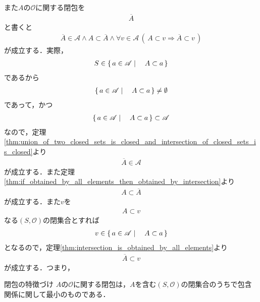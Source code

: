 	また$A$の$\mathscr{O}$に関する閉包を
	\begin{align}
		\overline{A}
	\end{align}
	と書くと
	\begin{align}
		\overline{A} \in \mathscr{A} \wedge A \subset \overline{A} \wedge
		\forall v \in \mathscr{A}\, \left(\, A \subset v \Longrightarrow \overline{A} \subset v\, \right)
		\label{fom:closure_is_the_smallest_closed_set}
	\end{align}
	が成立する．実際，
	\begin{align}
		S \in \left\{\, a \in \mathscr{A} \mid \quad A \subset a\, \right\}
	\end{align}
	であるから
	\begin{align}
		\left\{\, a \in \mathscr{A} \mid \quad A \subset a\, \right\} \neq \emptyset
	\end{align}
	であって，かつ
	\begin{align}
		\left\{\, a \in \mathscr{A} \mid \quad A \subset a\, \right\} \subset \mathscr{A}
	\end{align}
	なので，定理\ref{thm:union_of_two_closed_sets_is_closed_and_intersection_of_closed_sets_is_closed}より
	\begin{align}
		\overline{A} \in \mathscr{A}
	\end{align}
	が成立する．また定理\ref{thm:if_obtained_by_all_elements_then_obtained_by_intersection}より
	\begin{align}
		A \subset \overline{A}
	\end{align}
	が成立する．また$v$を
	\begin{align}
		A \subset v
	\end{align}
	なる$(S,\mathscr{O})$の閉集合とすれば
	\begin{align}
		v \in \left\{\, a \in \mathscr{A} \mid \quad A \subset a\, \right\}
	\end{align}
	となるので，定理\ref{thm:intersection_is_obtained_by_all_elements}より
	\begin{align}
		\overline{A} \subset v
	\end{align}
	が成立する．つまり，
	\begin{itembox}[l]{閉包の特徴づけ}
		$A$の$\mathscr{O}$に関する閉包は，$A$を含む$(S,\mathscr{O})$の閉集合のうちで包含関係に関して最小のものである．
	\end{itembox}
	
